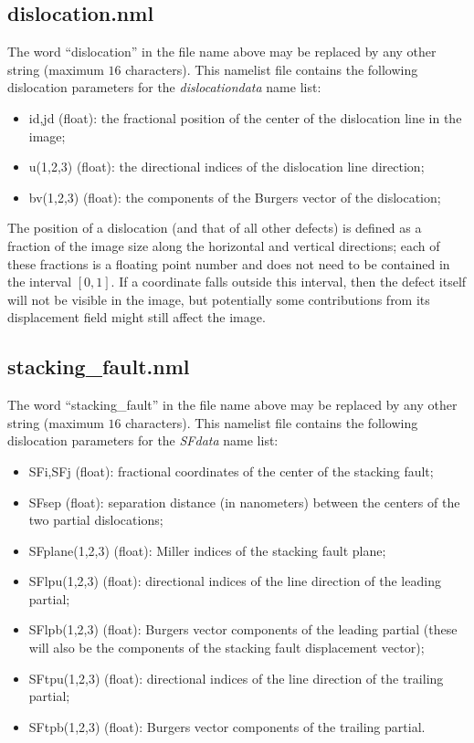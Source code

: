 \documentclass[11pt]{article}
\begin{document}
\subsection{dislocation.nml}
The word ``dislocation'' in the file name above may be replaced by any other string (maximum $16$ characters).
This namelist file contains the following dislocation parameters for the \textit{dislocationdata} name list:
\begin{itemize}
\item \textsf{id,jd} (float): the fractional position of the center of the dislocation line in the image;
\item \textsf{u(1,2,3)} (float):  the directional indices of the dislocation line direction;
\item \textsf{bv(1,2,3)} (float): the components of the Burgers vector of the dislocation;
\end{itemize}
The position of a dislocation (and that of all other defects) is defined as a fraction of the image size along the horizontal 
and vertical directions; each of these fractions is a floating point number and does not need to be contained in the 
interval $[0,1]$.  If a coordinate falls outside this interval, then the defect itself will not be visible in the image, but potentially
some contributions from its displacement field might still affect the image.

\subsection{stacking\_fault.nml}
The word ``stacking\_fault'' in the file name above may be replaced by any other string (maximum $16$ characters).
This namelist file contains the following dislocation parameters for the \textit{SFdata} name list:
\begin{itemize}
\item \textsf{SFi,SFj} (float): fractional coordinates of the center of the stacking fault;
\item \textsf{SFsep} (float): separation distance (in nanometers) between the centers of the two partial dislocations; 
\item \textsf{SFplane(1,2,3)} (float): Miller indices of the stacking fault plane;
\item \textsf{SFlpu(1,2,3)} (float): directional indices of the line direction of the leading partial;
\item \textsf{SFlpb(1,2,3)} (float): Burgers vector components of the leading partial (these will also be the components of the stacking fault displacement vector); 
\item \textsf{SFtpu(1,2,3)} (float): directional indices of the line direction of the trailing partial;
\item \textsf{SFtpb(1,2,3)} (float): Burgers vector components of the trailing partial.
\end{itemize}
\end{document}
